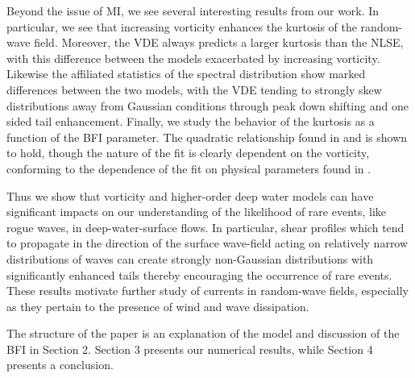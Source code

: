 \documentclass[a4paper,11pt]{article}
\begin{document}
Beyond the issue of MI, we see several interesting results from our work.  In particular, we see that increasing vorticity enhances the kurtosis of the random-wave field.  Moreover, the VDE always predicts a larger kurtosis than the NLSE, with this difference between the models exacerbated by increasing vorticity.  Likewise the affiliated statistics of the spectral distribution show marked differences between the two models, with the VDE tending to strongly skew distributions away from Gaussian conditions through peak down shifting and one sided tail enhancement.  Finally, we study the behavior of the kurtosis as a function of the BFI parameter.  The quadratic relationship found in \cite{janssen} and \cite{eeltink} is shown to hold, though the nature of the fit is clearly dependent on the vorticity, conforming to the dependence of the fit on physical parameters found in \cite{eeltink}.

 Thus we show that vorticity and higher-order deep water models can have significant impacts on our understanding of the likelihood of rare events, like rogue waves, in deep-water-surface flows.  In particular, shear profiles which tend to propagate in the direction of the surface wave-field acting on relatively narrow distributions of waves can create strongly non-Gaussian distributions with significantly enhanced tails thereby encouraging the occurrence of rare events.  These results motivate further study of currents in random-wave fields, especially as they pertain to the presence of wind and wave dissipation.  

The structure of the paper is an explanation of the model and discussion of the BFI in Section 2.  Section 3 presents our numerical results, while Section 4 presents a conclusion.  
\end{document}
